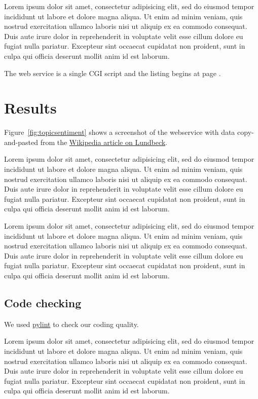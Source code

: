 \documentclass[10pt]{IEEEtran}
\begin{document}
Lorem ipsum dolor sit amet, consectetur adipisicing elit, sed do
eiusmod tempor incididunt ut labore et dolore magna aliqua. Ut enim ad
minim veniam, quis nostrud exercitation ullamco laboris nisi ut
aliquip ex ea commodo consequat. Duis aute irure dolor in
reprehenderit in voluptate velit esse cillum dolore eu fugiat nulla
pariatur. Excepteur sint occaecat cupidatat non proident, sunt in
culpa qui officia deserunt mollit anim id est laborum.

The web service is a single CGI script and the listing begins at page
\pageref{listing:brede_str_nmf}. 

\section{Results}

Figure~\ref{fig:topicsentiment} shows a screenshot of the webservice
with data copy-and-pasted from the
\href{http://en.wikipedia.org/wiki/Lundbeck}{Wikipedia article on
  Lundbeck}. 

Lorem ipsum dolor sit amet, consectetur adipisicing elit, sed do
eiusmod tempor incididunt ut labore et dolore magna aliqua. Ut enim ad
minim veniam, quis nostrud exercitation ullamco laboris nisi ut
aliquip ex ea commodo consequat. Duis aute irure dolor in
reprehenderit in voluptate velit esse cillum dolore eu fugiat nulla
pariatur. Excepteur sint occaecat cupidatat non proident, sunt in
culpa qui officia deserunt mollit anim id est laborum.

Lorem ipsum dolor sit amet, consectetur adipisicing elit, sed do
eiusmod tempor incididunt ut labore et dolore magna aliqua. Ut enim ad
minim veniam, quis nostrud exercitation ullamco laboris nisi ut
aliquip ex ea commodo consequat. Duis aute irure dolor in
reprehenderit in voluptate velit esse cillum dolore eu fugiat nulla
pariatur. Excepteur sint occaecat cupidatat non proident, sunt in
culpa qui officia deserunt mollit anim id est laborum.

\subsection{Code checking}

We used \href{http://www.logilab.org/857}{pylint} to check our coding
quality. 

Lorem ipsum dolor sit amet, consectetur adipisicing elit, sed do
eiusmod tempor incididunt ut labore et dolore magna aliqua. Ut enim ad
minim veniam, quis nostrud exercitation ullamco laboris nisi ut
aliquip ex ea commodo consequat. Duis aute irure dolor in
reprehenderit in voluptate velit esse cillum dolore eu fugiat nulla
pariatur. Excepteur sint occaecat cupidatat non proident, sunt in
culpa qui officia deserunt mollit anim id est laborum.
\end{document}
